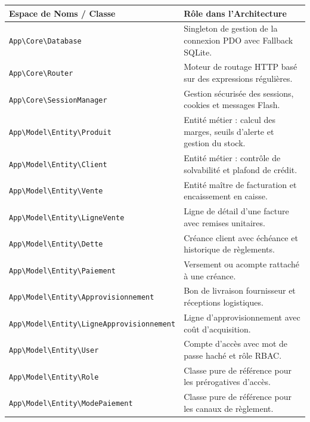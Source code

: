 \documentclass[11pt,a4paper,titlepage,twoside,openright]{report}
\begin{document}
\begin{table}[htbp]
\centering
\small
\begin{tabularx}{\textwidth}{lX}
\toprule
\textbf{Espace de Noms / Classe} & \textbf{Rôle dans l'Architecture} \\
\midrule
\texttt{App\textbackslash Core\textbackslash Database} & Singleton de gestion de la connexion PDO avec Fallback SQLite. \\
\texttt{App\textbackslash Core\textbackslash Router} & Moteur de routage HTTP basé sur des expressions régulières. \\
\texttt{App\textbackslash Core\textbackslash SessionManager} & Gestion sécurisée des sessions, cookies et messages Flash. \\
\texttt{App\textbackslash Model\textbackslash Entity\textbackslash Produit} & Entité métier : calcul des marges, seuils d'alerte et gestion du stock. \\
\texttt{App\textbackslash Model\textbackslash Entity\textbackslash Client} & Entité métier : contrôle de solvabilité et plafond de crédit. \\
\texttt{App\textbackslash Model\textbackslash Entity\textbackslash Vente} & Entité maître de facturation et encaissement en caisse. \\
\texttt{App\textbackslash Model\textbackslash Entity\textbackslash LigneVente} & Ligne de détail d'une facture avec remises unitaires. \\
\texttt{App\textbackslash Model\textbackslash Entity\textbackslash Dette} & Créance client avec échéance et historique de règlements. \\
\texttt{App\textbackslash Model\textbackslash Entity\textbackslash Paiement} & Versement ou acompte rattaché à une créance. \\
\texttt{App\textbackslash Model\textbackslash Entity\textbackslash Approvisionnement} & Bon de livraison fournisseur et réceptions logistiques. \\
\texttt{App\textbackslash Model\textbackslash Entity\textbackslash LigneApprovisionnement} & Ligne d'approvisionnement avec coût d'acquisition. \\
\texttt{App\textbackslash Model\textbackslash Entity\textbackslash User} & Compte d'accès avec mot de passe haché et rôle RBAC. \\
\texttt{App\textbackslash Model\textbackslash Entity\textbackslash Role} & Classe pure de référence pour les prérogatives d'accès. \\
\texttt{App\textbackslash Model\textbackslash Entity\textbackslash ModePaiement} & Classe pure de référence pour les canaux de règlement. \\

\end{tabularx}
\end{table}
\end{document}
